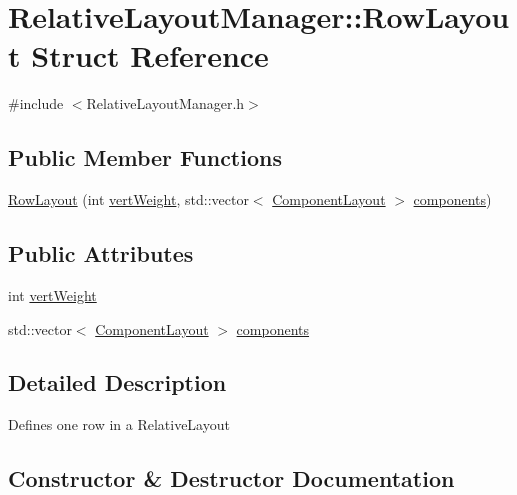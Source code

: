 \hypertarget{structRelativeLayoutManager_1_1RowLayout}{}\section{Relative\+Layout\+Manager\+:\+:Row\+Layout Struct Reference}
\label{structRelativeLayoutManager_1_1RowLayout}


{\ttfamily \#include $<$Relative\+Layout\+Manager.\+h$>$}

\subsection*{Public Member Functions}
\begin{DoxyCompactItemize}
\item 
\mbox{\hyperlink{structRelativeLayoutManager_1_1RowLayout_ab9039df59d5eeba79c01f62e39f4040f}{Row\+Layout}} (int \mbox{\hyperlink{structRelativeLayoutManager_1_1RowLayout_afb33df3a1c79a0235aba277444252b7c}{vert\+Weight}}, std\+::vector$<$ \mbox{\hyperlink{structRelativeLayoutManager_1_1ComponentLayout}{Component\+Layout}} $>$ \mbox{\hyperlink{structRelativeLayoutManager_1_1RowLayout_a72c20ec2575facd2fc7065542a19a978}{components}})
\end{DoxyCompactItemize}
\subsection*{Public Attributes}
\begin{DoxyCompactItemize}
\item 
int \mbox{\hyperlink{structRelativeLayoutManager_1_1RowLayout_afb33df3a1c79a0235aba277444252b7c}{vert\+Weight}}
\item 
std\+::vector$<$ \mbox{\hyperlink{structRelativeLayoutManager_1_1ComponentLayout}{Component\+Layout}} $>$ \mbox{\hyperlink{structRelativeLayoutManager_1_1RowLayout_a72c20ec2575facd2fc7065542a19a978}{components}}
\end{DoxyCompactItemize}


\subsection{Detailed Description}
Defines one row in a Relative\+Layout 

\subsection{Constructor \& Destructor Documentation}
\mbox{\label{structRelativeLayoutManager_1_1RowLayout_ab9039df59d5eeba79c01f62e39f4040f}} 
